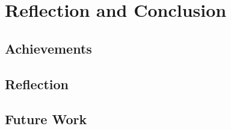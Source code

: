 \chapter{Reflection and Conclusion}

\section{Achievements}
\section{Reflection}
\section{Future Work}
